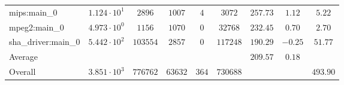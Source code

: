 \begin{tabular}{|l|c|c|c|c|c|c|c|c|}
mips:main\_0            & $ 1.124 \cdot 10^{1}  $ & $ 2896   $ & $ 1007  $ & $ 4   $ & $ 3072   $ & $ 257.73      $ & $ 1.12    $ & $ 5.22    $ \\
mpeg2:main\_0           & $ 4.973 \cdot 10^{0}  $ & $ 1156   $ & $ 1070  $ & $ 0   $ & $ 32768  $ & $ 232.45      $ & $ 0.70    $ & $ 2.70    $ \\
sha\_driver:main\_0     & $ 5.442 \cdot 10^{2}  $ & $ 103554 $ & $ 2857  $ & $ 0   $ & $ 117248 $ & $ 190.29      $ & $ -0.25   $ & $ 51.77   $ \\
\hline
Average                 & $                     $ & $        $ & $       $ & $     $ & $        $ & $ 209.57      $ & $ 0.18    $ & $         $ \\
\hline
Overall                 & $ 3.851 \cdot 10^{3}  $ & $ 776762 $ & $ 63632 $ & $ 364 $ & $ 730688 $ & $             $ & $         $ & $ 493.90  $ \\
\hline
\end{tabular}
